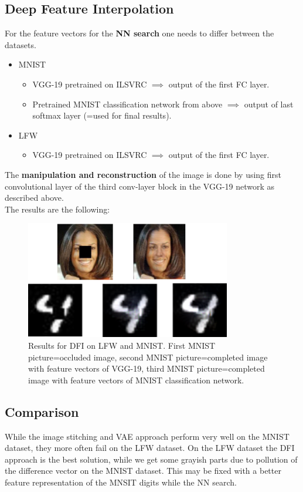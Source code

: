 \documentclass[
     11pt,         %
     a4paper,      %
     oneside,
     ]{article}
\begin{document}
\subsection{Deep Feature Interpolation}
For the feature vectors for the \textbf{NN search} one needs to differ between the datasets.
\begin{itemize}
  \item MNIST
  \begin{itemize}
    \item VGG-19 pretrained on ILSVRC $\implies$ output of the first FC layer.
    \item Pretrained MNIST classification network from above $\implies$ output of last softmax layer (=used for final results).
  \end{itemize}
  \item LFW
  \begin{itemize}
    \item VGG-19 pretrained on ILSVRC $\implies$ output of the first FC layer.
  \end{itemize}
\end{itemize}
The \textbf{manipulation and reconstruction} of the image is done by using first convolutional layer of the third conv-layer block in the VGG-19 network as described above. \\
The results are the following:
  \begin{figure}[H]
    \begin{center}
      \includegraphics[width=0.8\textwidth]{images/DFI-final2.png}
      \caption{Results for DFI on LFW and MNIST. First MNIST picture=occluded image, second MNIST picture=completed image with feature vectors of VGG-19, third MNIST picture=completed image with feature vectors of MNIST classification network.}
    \end{center}
  \end{figure}
\subsection{Comparison}
While the image stitching and VAE approach perform very well on the MNIST dataset, they more often fail on the LFW dataset. On the LFW dataset the DFI approach is the best solution, while we get some grayish parts due to pollution of the difference vector on the MNIST dataset. This may be fixed with a better feature representation of the MNSIT digits while the NN search.
\cite{dummyEntry}


\newpage
{}


\end{document}

